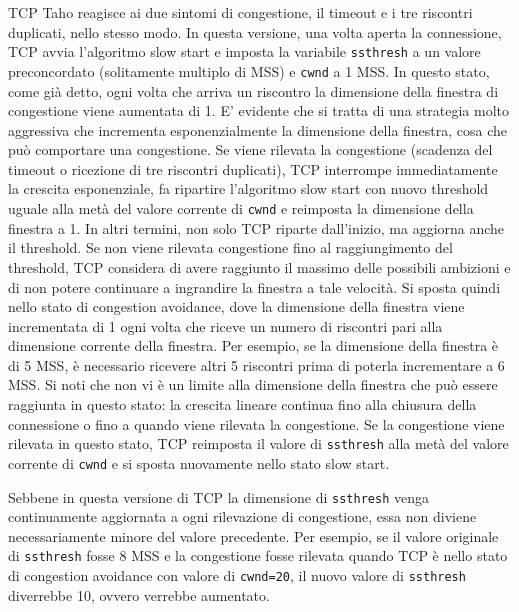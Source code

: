 TCP Taho reagisce ai due sintomi di congestione, il timeout e i tre riscontri duplicati, nello stesso modo. In questa versione, una volta aperta la connessione, TCP avvia l'algoritmo slow start e imposta la variabile \verb|ssthresh| a un valore preconcordato (solitamente multiplo di MSS) e \verb|cwnd| a 1 MSS. In questo stato, come già detto, ogni volta che arriva un riscontro la dimensione della finestra di congestione viene aumentata di 1. E' evidente che si tratta di una strategia molto aggressiva che incrementa esponenzialmente la dimensione della finestra, cosa che può comportare una congestione. Se viene rilevata la congestione (scadenza del timeout o ricezione di tre riscontri duplicati), TCP interrompe immediatamente la crescita esponenziale, fa ripartire l'algoritmo slow start con nuovo threshold uguale alla metà del valore corrente di \verb|cwnd| e reimposta la dimensione della finestra a 1. In altri termini, non solo TCP riparte dall'inizio, ma aggiorna anche il threshold. Se non viene rilevata congestione fino al raggiungimento del threshold, TCP considera di avere raggiunto il massimo delle possibili ambizioni e di non potere continuare a ingrandire la finestra a tale velocità. Si sposta quindi nello stato di congestion avoidance, dove la dimensione della finestra viene incrementata di 1 ogni volta che riceve un numero di riscontri pari alla dimensione corrente della finestra. Per esempio, se la dimensione della finestra è di 5 MSS, è necessario ricevere altri 5 riscontri prima di poterla incrementare a 6 MSS. Si noti che non vi è un limite alla dimensione della finestra che può essere raggiunta in questo stato: la crescita lineare continua fino alla chiusura della connessione o fino a quando viene rilevata la congestione. Se la congestione viene rilevata in questo stato, TCP reimposta il valore di \verb|ssthresh| alla metà del valore corrente di \verb|cwnd| e si sposta nuovamente nello stato slow start.

Sebbene in questa versione di TCP la dimensione di \verb|ssthresh| venga continuamente aggiornata a ogni rilevazione di congestione, essa non diviene necessariamente minore del valore precedente. Per esempio, se il valore originale di \verb|ssthresh| fosse 8 MSS e la congestione fosse rilevata quando TCP è nello stato di congestion avoidance con valore di \verb|cwnd=20|, il nuovo valore di \verb|ssthresh| diverrebbe 10, ovvero verrebbe aumentato.

